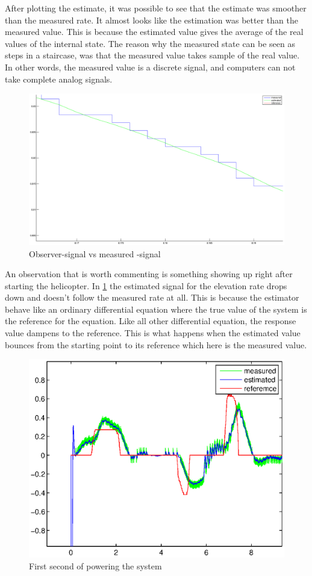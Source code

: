 After plotting the estimate, it was possible to see that the estimate was smoother than the measured rate. It almost looks like the estimation was better than the measured value. This is because the estimated value gives the average of the real values of the internal state. The reason why the measured state can be seen as steps in a staircase, was that the measured value takes sample of the real value. In other words, the measured value is a discrete signal, and computers can not take complete analog signals. 

\begin{figure}[H]
    \begin{center}
    \includegraphics[width=0.5\linewidth]{Part4_pictures/estimatorvsmeasured.eps}
    \caption{Observer-signal vs measured -signal }
    \end{center}
\end{figure}
An observation that is worth commenting is something showing up right after starting the helicopter. In \cref{estimation_opservasjon} the estimated signal for the elevation rate drops down and doesn't follow the measured rate at all. This is because the estimator behave like an ordinary differential equation where the true value of the system is the reference for the equation. Like all other differential equation, the response value dampens to the reference. This is what happens when the estimated value bounces from the starting point to its reference which here is the measured value.
\begin{figure}[H]
    \begin{center}
    \includegraphics[width=0.5\linewidth]{Part4_pictures/p4p2_noint/p1_elevrate_zoomedin.eps}
    \caption{First second of powering the system}
    \end{center}
    \label{estimation_opservasjon}
\end{figure}


